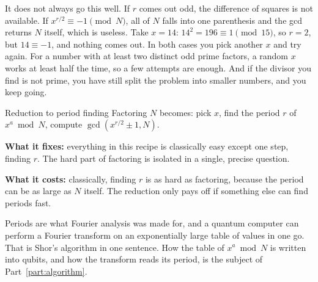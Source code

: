 It does not always go this well. If $r$ comes out odd, the difference of squares
is not available. If $x^{r/2} \equiv -1 \pmod N$, all of $N$ falls into one
parenthesis and the gcd returns $N$ itself, which is useless. Take $x = 14$:
$14^2 = 196 \equiv 1 \pmod{15}$, so $r = 2$, but $14 \equiv -1$, and nothing
comes out. In both cases you pick another $x$ and try again. For a number with
at least two distinct odd prime factors, a random $x$ works at least half the
time, so a few attempts are enough. And if the divisor you find is not prime,
you have still split the problem into smaller numbers, and you keep going.

\begin{concept}{Reduction to period finding}
Factoring $N$ becomes: pick $x$, find the period $r$ of $x^a \bmod N$, compute
$\gcd(x^{r/2} \pm 1, N)$.

\textbf{What it fixes:} everything in this recipe is classically easy except one
step, finding $r$. The hard part of factoring is isolated in a single, precise
question.

\textbf{What it costs:} classically, finding $r$ is as hard as factoring, because
the period can be as large as $N$ itself. The reduction only pays off if
something else can find periods fast.
\end{concept}

Periods are what Fourier analysis was made for, and a quantum computer can
perform a Fourier transform on an exponentially large table of values in one go.
That is Shor's algorithm in one sentence. How the table of $x^a \bmod N$ is
written into qubits, and how the transform reads its period, is the subject of
Part~\ref{part:algorithm}.
